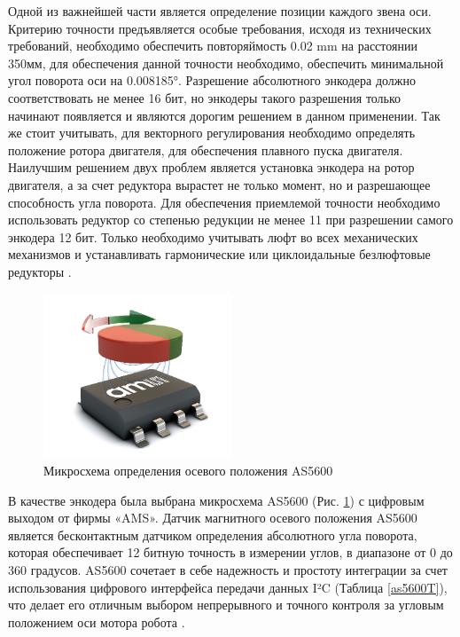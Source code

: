 Одной из важнейшей части является определение позиции каждого звена оси. Критерию точности предъявляется особые требования, исходя из технических требований, необходимо обеспечить повторяймость 0.02 mm на расстоянии 350мм, для обеспечения данной точности необходимо, обеспечить минимальной угол поворота оси на 0.008185°. Разрешение абсолютного энкодера должно соответствовать не менее 16 бит, но энкодеры такого разрешения только начинают появляется и являются дорогим решением в данном применении. Так же стоит учитывать, для векторного регулирования необходимо определять положение ротора двигателя, для обеспечения плавного пуска двигателя. Наилучшим решением двух проблем является установка энкодера на ротор двигателя, а за счет редуктора вырастет не только момент, но и разрешающее способность угла поворота.  Для обеспечения приемлемой точности необходимо использовать редуктор со степенью редукции не менее 11 при разрешении самого энкодера 12 бит. Только необходимо учитывать люфт во всех механических механизмов и устанавливать гармонические или циклоидальные безлюфтовые редукторы \citep{Sensinger2012}.


\begin{figure}[H]
	\centering
	\includegraphics[width=0.5\textwidth]{Src/images/as5600.png}
	\caption{ Микросхема определения осевого положения AS5600}
	\label{as5600P}
\end{figure}

В качестве энкодера была выбрана микросхема AS5600 (Рис. \ref{as5600P}) с цифровым выходом от фирмы «AMS». Датчик магнитного осевого положения AS5600 является бесконтактным датчиком определения абсолютного угла поворота, которая обеспечивает 12 битную точность в измерении углов, в диапазоне от 0 до 360 градусов. AS5600 сочетает в себе надежность и простоту интеграции за счет использования цифрового интерфейса передачи данных I²C (Таблица \ref{as5600T}), что делает его отличным выбором непрерывного и точного контроля за угловым положением оси мотора робота \citep{ams}.

